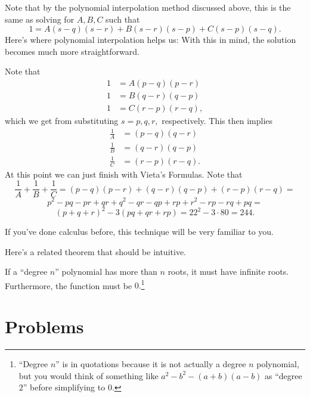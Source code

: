 \documentclass{article}
\begin{document}
\begin{sol}
Note that by the polynomial interpolation method discussed above, this is the same as solving for $A,B,C$ such that
\[1=A(s-q)(s-r)+B(s-r)(s-p)+C(s-p)(s-q).\]
Here's where polynomial interpolation helps us:  With this in mind, the solution becomes much more straightforward.

Note that
\begin{align*}
1&=A(p-q)(p-r) \\
1&=B(q-r)(q-p) \\
1&=C(r-p)(r-q),
\end{align*}
which we get from substituting $s=p,q,r,$ respectively. This then implies
\begin{align*}
\frac{1}{A}&=(p-q)(q-r) \\
\frac{1}{B}&=(q-r)(q-p) \\
\frac{1}{C}&=(r-p)(r-q).
\end{align*}
At this point we can just finish with Vieta's Formulas. Note that
\[\frac{1}{A}+\frac{1}{B}+\frac{1}{C}=(p-q)(p-r)+(q-r)(q-p)+(r-p)(r-q)=\]
\[p^2-pq-pr+qr+q^2-qr-qp+rp+r^2-rp-rq+pq=\]
\[(p+q+r)^2-3(pq+qr+rp)=22^2-3\cdot 80=244.\]
\end{sol}

If you've done calculus before, this technique will be very familiar to you.

Here's a related theorem that should be intuitive.

\begin{fact}
If a ``degree $n$'' polynomial has more than $n$ roots, it must have infinite roots. Furthermore, the function must be $0.$\footnote{``Degree $n$'' is in quotations because it is not actually a degree $n$ polynomial, but you would think of something like $a^2-b^2-(a+b)(a-b)$ as ``degree $2$'' before simplifying to $0.$}
\end{fact}

\pagebreak

\section{Problems}




\end{document}
